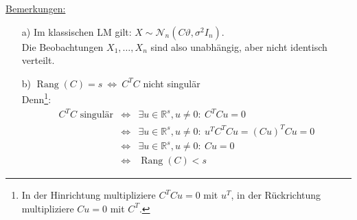 \documentclass[a4paper,11pt,twoside,titlepage]{article}
\newcommand{\R}{{\mathbb R}}
\newcommand\NN{ \mathcal{N} } %
\begin{document}
\underline{Bemerkungen:}
\begin{itemize}
\item[a) ]Im klassischen LM gilt: $X\sim\NN_n(C\vartheta,\sigma^2I_n)$.\\
Die Beobachtungen $X_1,\ldots,X_n$ sind also unabhängig, aber nicht identisch verteilt.
\item[b) ]$\operatorname{Rang}(C)=s\ \Leftrightarrow\ C^TC$ nicht singulär\\
Denn\footnote{In der Hinrichtung multipliziere $C^TCu=0$ mit $u^T$, in der Rückrichtung multipliziere $Cu=0$ mit $C^T$.}:
\begin{eqnarray*}
C^TC\mbox{ singulär}&\Leftrightarrow&\exists u\in\R^s, u\neq0:\ C^TCu=0\\
&\Leftrightarrow&\exists u\in\R^s, u\neq0:\ u^TC^TCu=(Cu)^TCu=0\\
&\Leftrightarrow&\exists u\in\R^s, u\neq0:\ Cu=0\\
&\Leftrightarrow&\operatorname{Rang}(C)<s\end{eqnarray*}
\end{itemize}
\end{document}
